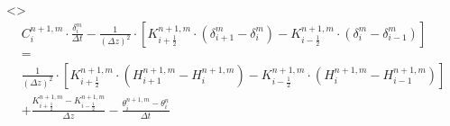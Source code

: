 \documentclass[xcolor=dvipsnames]{beamer}
\newcounter{secondElement}
\begin{document}
\begin{frame}[t]
  \only<\thesecondElement>{
    \begin{gather*}
      C_i^{n+1,m} \cdot \frac{\delta_i^m}{\Delta t} - \frac{1}{\left(\Delta z\right)^2} \cdot \left[K_{i+\frac{1}{2}}^{n+1,m} \cdot \left(\delta_{i+1}^m - \delta_i^m\right) - K_{i-\frac{1}{2}}^{n+1,m} \cdot \left(\delta_i^m - \delta_{i-1}^m\right)\right] \\[+0.5mm]
      = \\[+0.5mm]
      \frac{1}{\left(\Delta z\right)^2} \cdot \left[K_{i+\frac{1}{2}}^{n+1,m} \cdot \left(H_{i+1}^{n+1,m} - H_i^{n+1,m}\right) - K_{i-\frac{1}{2}}^{n+1,m} \cdot \left(H_{i}^{n+1,m} - H_{i-1}^{n+1,m}\right)\right] \\[+0.5mm]
      + \frac{K_{i+\frac{1}{2}}^{n+1,m} - K_{i-\frac{1}{2}}^{n+1,m}}{\Delta z} - \frac{\theta_i^{n+1,m}-\theta_i^{n}}{\Delta t}
    \end{gather*}}


\end{frame}
\end{document}
